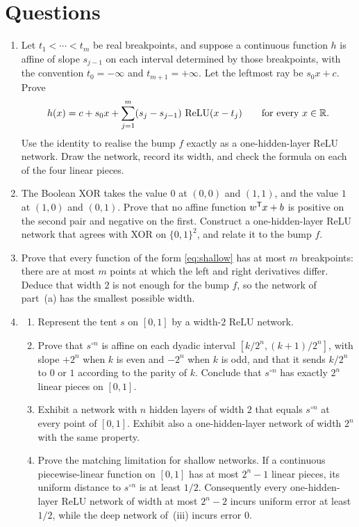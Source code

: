 \section{Questions}

\begin{enumerate}[label=\textbf{(\alph*)}]
  \item Let \(t_1<\cdots<t_m\) be real breakpoints, and suppose a continuous function \(h\) is affine of slope \(s_{j-1}\) on each interval determined by those breakpoints, with the convention \(t_0=-\infty\) and \(t_{m+1}=+\infty\). Let the leftmost ray be \(s_0 x + c\). Prove
  \begin{equation}
    h(x)
    =
    c + s_0 x + \sum_{j=1}^{m} (s_j-s_{j-1})\,\operatorname{ReLU}(x-t_j)
    \qquad\text{for every } x\in\mathbb{R}.
    \label{eq:kinkbasis}
  \end{equation}
  Use the identity to realise the bump \(f\) exactly as a one-hidden-layer ReLU network. Draw the network, record its width, and check the formula on each of the four linear pieces.

  \item The Boolean XOR takes the value \(0\) at \((0,0)\) and \((1,1)\), and the value \(1\) at \((1,0)\) and \((0,1)\). Prove that no affine function \(w^{\mathsf{T}} x + b\) is positive on the second pair and negative on the first. Construct a one-hidden-layer ReLU network that agrees with XOR on \(\{0,1\}^2\), and relate it to the bump \(f\).

  \item Prove that every function of the form \eqref{eq:shallow} has at most \(m\) breakpoints: there are at most \(m\) points at which the left and right derivatives differ. Deduce that width \(2\) is not enough for the bump \(f\), so the network of part~(a) has the smallest possible width.

  \item \begin{enumerate}[label=\textbf{(\roman*)}, itemsep=0.4em, topsep=0.35em]
    \item Represent the tent \(s\) on \([0,1]\) by a width-\(2\) ReLU network.
    \item Prove that \(s^{\circ n}\) is affine on each dyadic interval \([k/2^n,(k+1)/2^n]\), with slope \(+2^n\) when \(k\) is even and \(-2^n\) when \(k\) is odd, and that it sends \(k/2^n\) to \(0\) or \(1\) according to the parity of \(k\). Conclude that \(s^{\circ n}\) has exactly \(2^n\) linear pieces on \([0,1]\).
    \item Exhibit a network with \(n\) hidden layers of width \(2\) that equals \(s^{\circ n}\) at every point of \([0,1]\). Exhibit also a one-hidden-layer network of width \(2^n\) with the same property.
    \item Prove the matching limitation for shallow networks. If a continuous piecewise-linear function on \([0,1]\) has at most \(2^n-1\) linear pieces, its uniform distance to \(s^{\circ n}\) is at least \(1/2\). Consequently every one-hidden-layer ReLU network of width at most \(2^n-2\) incurs uniform error at least \(1/2\), while the deep network of~(iii) incurs error \(0\).
  \end{enumerate}


\end{enumerate}
